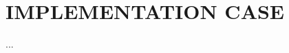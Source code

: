 \documentclass[../report.tex]{subfiles}
\begin{document}
\section{IMPLEMENTATION CASE}


...
\end{document}
